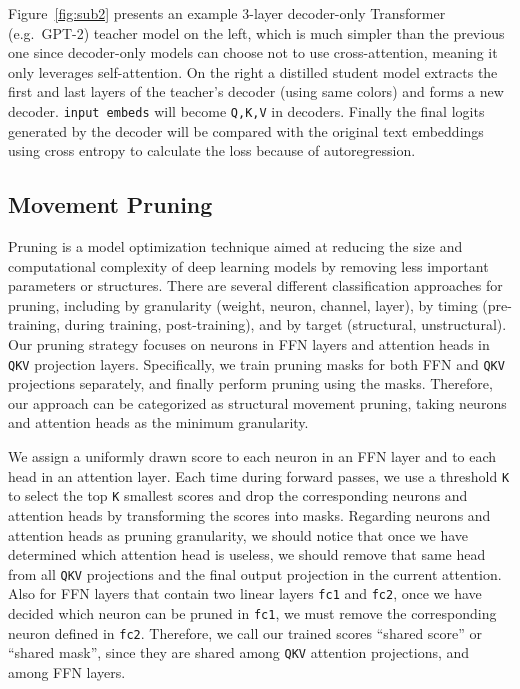 Figure~\ref{fig:sub2} presents an example 3-layer decoder-only Transformer (e.g.\ GPT-2) teacher model on the left,
which is much simpler than the previous one since decoder-only models can choose not to use cross-attention, meaning it only leverages self-attention.
On the right a distilled student model extracts the first and last layers of the teacher's decoder (using same colors) and forms a new decoder.
\texttt{input embeds} will become \texttt{Q,K,V} in decoders.
Finally the final logits generated by the decoder will be compared with the original text embeddings using cross entropy to calculate the loss because of autoregression.


\subsection{Movement Pruning}\label{subsec:mt:movement-pruning}
Pruning is a model optimization technique aimed at reducing the size and computational complexity of deep learning models by removing less important parameters or structures.
There are several different classification approaches for pruning, including by granularity (weight, neuron, channel, layer),
by timing (pre-training, during training, post-training), and by target (structural, unstructural).
Our pruning strategy focuses on neurons in FFN layers and attention heads in \texttt{QKV} projection layers.
Specifically, we train pruning masks for both FFN and \texttt{QKV} projections separately, and finally perform pruning using the masks.
Therefore, our approach can be categorized as structural movement pruning, taking neurons and attention heads as the minimum granularity.

We assign a uniformly drawn score to each neuron in an FFN layer and to each head in an attention layer.
Each time during forward passes, we use a threshold \texttt{K} to select the top \texttt{K}
smallest scores and drop the corresponding neurons and attention heads by transforming the scores into masks.
Regarding neurons and attention heads as pruning granularity,
we should notice that once we have determined which attention head is useless,
we should remove that same head from all \texttt{QKV} projections and the final output projection in the current attention.
Also for FFN layers that contain two linear layers \texttt{fc1} and \texttt{fc2},
once we have decided which neuron can be pruned in \texttt{fc1},
we must remove the corresponding neuron defined in \texttt{fc2}.
Therefore, we call our trained scores ``shared score'' or ``shared mask'',
since they are shared among \texttt{QKV} attention projections, and among FFN layers.

